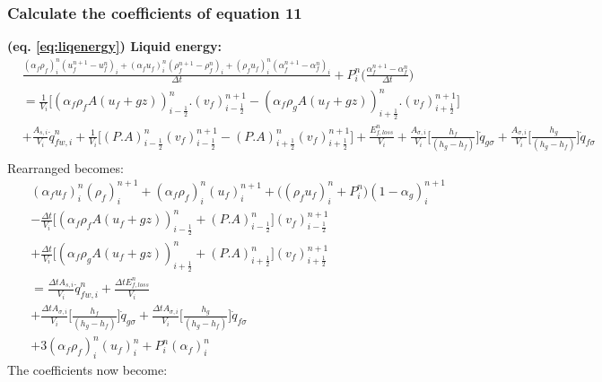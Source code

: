\documentclass[11pt,letterpaper,titlepage]{article}
\newcommand{\half}{\frac{1}{2}}
\begin{document}
\subsubsection{Calculate the coefficients of equation 11}
\textbf{(eq. \ref{eq:liqenergy}) Liquid energy:}
\begin{equation*}
\begin{aligned}
&\frac{(\alpha_f\rho_f)_i^n (u_f^{n+1}-u_f^{n})_i+(\alpha_f u_f)_i^n   (\rho_f^{n+1} - \rho_f^n)_i+(\rho_f u_f)_i^n     (\alpha_f^{n+1}-\alpha_f^n)_i}{\Delta t} + P_i^n \biggr( \frac{\alpha_f^{n+1}-\alpha_f^n}{\Delta t} \biggr)\\
&=\frac{1}{V_i}\biggr[ (\alpha_f\rho_f A(u_f+gz))_{i-\half}^n.(v_f)_{i-\half}^{n+1} - (\alpha_f\rho_g A(u_f+gz))_{i+\half}^n.(v_f)_{i+\half}^{n+1} \biggr] \\
&+\frac{A_{s,i}}{V_i}\dot{q}_{fw,i}^n + \frac{1}{V_i}\biggr[   (P.A)_{i-\half}^n(v_f)_{i-\half}^{n+1} - (P.A)_{i+\half}^n(v_f)_{i+\half}^{n+1}   \biggr] + \frac{E_{f,loss}^n}{V_i}
+\frac{A_{\sigma,i}}{V_i} \biggr[\frac{ h_f  }{(h_g-h_f)}  \biggr]\dot{q}_{g\sigma}
+\frac{A_{\sigma,i}}{V_i} \biggr[\frac{ h_g }{(h_g-h_f)}  \biggr]\dot{q}_{f\sigma}\\
\end{aligned}
\end{equation*}
Rearranged becomes:
\begin{equation*}
\begin{aligned}
& (\alpha_f u_f)_i^n (\rho_f)_i^{n+1}
+ (\alpha_f\rho_f)_i^n (u_f)_i^{n+1}
+ \biggr( (\rho_f u_f)_i^n + P_i^n \biggr) (1-\alpha_g)_i^{n+1}\\
&-\frac{\Delta t}{V_i}\biggr[ (\alpha_f\rho_f A(u_f+gz))_{i-\half}^n + (P.A)_{i-\half}^n  \biggr] (v_f)_{i-\half}^{n+1} \\
&+ \frac{\Delta t}{V_i}\biggr[ (\alpha_f\rho_g A(u_f+gz))_{i+\half}^n   + (P.A)_{i+\half}^n   \biggr] (v_f)_{i+\half}^{n+1} \\
&=\frac{\Delta tA_{s,i}}{V_i}\dot{q}_{fw,i}^n  + \frac{\Delta tE_{f,loss}^n}{V_i}\\
&+\frac{\Delta tA_{\sigma,i}}{V_i} \biggr[\frac{ h_f  }{(h_g-h_f)}  \biggr]\dot{q}_{g\sigma}
 +\frac{\Delta tA_{\sigma,i}}{V_i} \biggr[\frac{ h_g }{(h_g-h_f)}  \biggr]\dot{q}_{f\sigma}\\
&+ 3(\alpha_f\rho_f)_i^n (u_f)_i^{n} + P_i^n (\alpha_f)_i^n
\end{aligned}
\end{equation*}
\newline
The coefficients now become:
\end{document}
